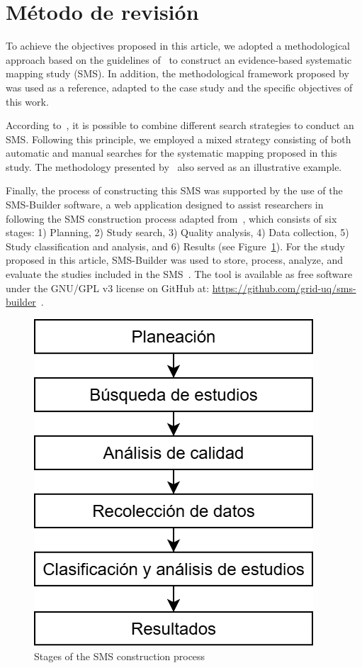 \section{Método de revisión}\label{sec:metodo-revision}

To achieve the objectives proposed in this article, we adopted a methodological approach based on the guidelines of~\cite{Kitchenham2010792, budgen2008using} to construct an evidence-based systematic mapping study (SMS). In addition, the methodological framework proposed by~\cite{Sepúlveda202141} was used as a reference, adapted to the case study and the specific objectives of this work.

According to~\cite{Erica2017HybridSS, Nguyen201562}, it is possible to combine different search strategies to conduct an SMS. Following this principle, we employed a mixed strategy consisting of both automatic and manual searches for the systematic mapping proposed in this study. The methodology presented by~\cite{Ali201988196} also served as an illustrative example.

Finally, the process of constructing this SMS was supported by the use of the SMS-Builder software, a web application designed to assist researchers in following the SMS construction process adapted from~\cite{Kitchenham2010792}, which consists of six stages: 1) Planning, 2) Study search, 3) Quality analysis, 4) Data collection, 5) Study classification and analysis, and 6) Results (see Figure~\ref{figure:Stages}). For the study proposed in this article, SMS-Builder was used to store, process, analyze, and evaluate the studies included in the SMS~\cite{Candela2022100935}. The tool is available as free software under the GNU/GPL v3 license on GitHub at: \url{https://github.com/grid-uq/sms-builder}~\cite{Candela2022100935}.

\begin{figure}[htbp]
	\centering
	\includegraphics[width=0.6\linewidth]{resources/figures/sms-Etapas.drawio.png}
	\caption{Stages of the SMS construction process}
	\label{figure:Stages}
\end{figure}

